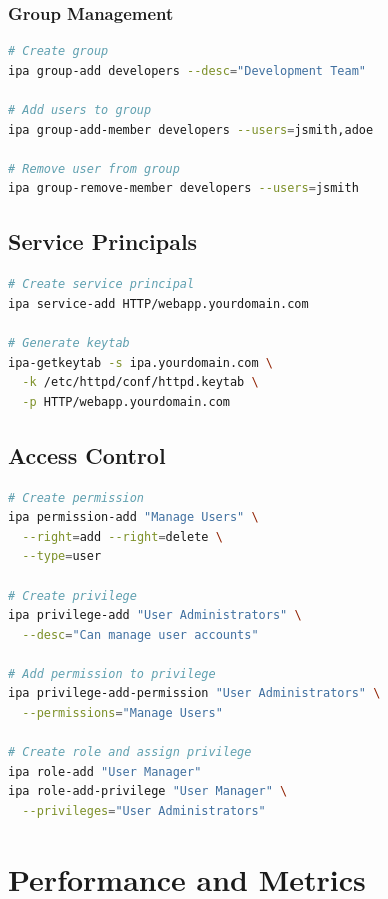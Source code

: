 \documentclass[12pt,a4paper]{report}
\begin{document}
\subsection{Group Management}

\begin{lstlisting}[language=bash,caption=Group Operations]
# Create group
ipa group-add developers --desc="Development Team"

# Add users to group
ipa group-add-member developers --users=jsmith,adoe

# Remove user from group
ipa group-remove-member developers --users=jsmith
\end{lstlisting}

\section{Service Principals}

\begin{lstlisting}[language=bash,caption=Service Principal Management]
# Create service principal
ipa service-add HTTP/webapp.yourdomain.com

# Generate keytab
ipa-getkeytab -s ipa.yourdomain.com \
  -k /etc/httpd/conf/httpd.keytab \
  -p HTTP/webapp.yourdomain.com
\end{lstlisting}

\section{Access Control}

\begin{lstlisting}[language=bash,caption=Permission Configuration]
# Create permission
ipa permission-add "Manage Users" \
  --right=add --right=delete \
  --type=user

# Create privilege
ipa privilege-add "User Administrators" \
  --desc="Can manage user accounts"

# Add permission to privilege
ipa privilege-add-permission "User Administrators" \
  --permissions="Manage Users"

# Create role and assign privilege
ipa role-add "User Manager"
ipa role-add-privilege "User Manager" \
  --privileges="User Administrators"
\end{lstlisting}

\chapter{Performance and Metrics}
\end{document}
